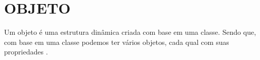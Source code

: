 \section{OBJETO}

Um objeto é uma estrutura dinâmica criada com base em uma classe. Sendo que, 
com base em uma classe podemos ter vários objetos, cada qual com suas 
propriedades \cite{phpProgramandoComOrientacaoAObjetos}.